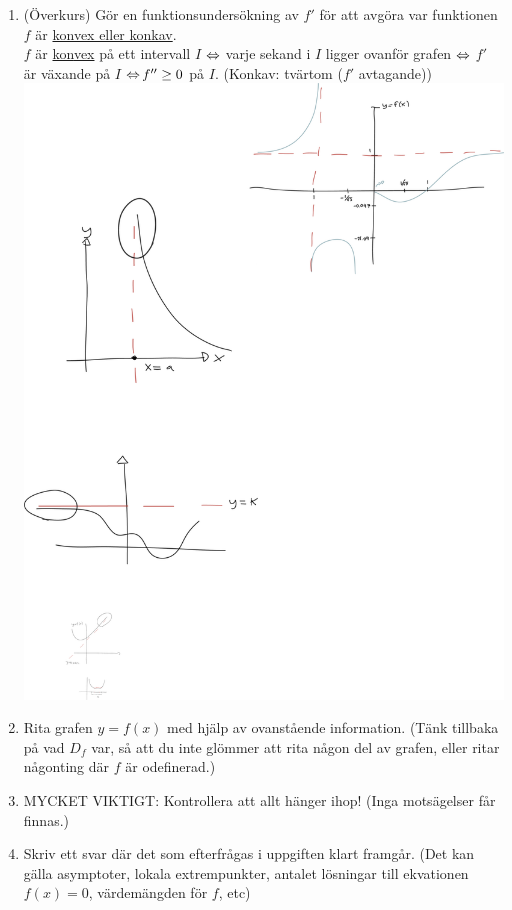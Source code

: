 \documentclass{article}
\begin{document}
\begin{enumerate}
  \item (Överkurs) Gör en funktionsundersökning av $f'$ för att avgöra var funktionen $f$ är \uline{konvex eller konkav}.\\
    $f$ är \uline{kon{\color{red}vex}} på ett intervall $I$ $\operatorname{\Leftrightarrow}$ varje sekand i $I$ ligger ovanför grafen $\operatorname{\Leftrightarrow}$ $f'$ är {\color{red}väx}ande på $I$ $\operatorname{\Leftrightarrow} f'' \ge 0$ på $I$.
    (Konk{\color{red}av}: tvärtom ($f'$ {\color{red}av}tagande))
    \includegraphics[scale=1.3]{img/sekant.pdf}\\

  \item Rita grafen $y=f(x)$ med hjälp av ovanstående information. (Tänk tillbaka på vad $D_f$ var, så att du inte glömmer att rita någon del av grafen, eller ritar någonting där $f$ är odefinerad.)

  \item  MYCKET VIKTIGT: Kontrollera att allt hänger ihop! (Inga motsägelser får finnas.)

  \item Skriv ett svar där det som efterfrågas i uppgiften klart framgår.
    (Det kan gälla asymptoter, lokala extrempunkter, antalet lösningar till ekvationen $f(x)=0$, värdemängden för $f$, etc)
\end{enumerate}
\end{document}
